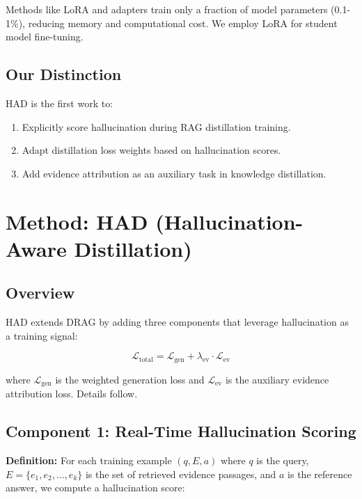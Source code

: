 \documentclass[11pt,a4paper]{article}
\begin{document}
Methods like LoRA \cite{lora} and adapters train only a fraction of model parameters (0.1-1\%), reducing memory and computational cost. We employ LoRA for student model fine-tuning.

\subsection{Our Distinction}

HAD is the first work to:
\begin{enumerate}
    \item Explicitly score hallucination during RAG distillation training.
    \item Adapt distillation loss weights based on hallucination scores.
    \item Add evidence attribution as an auxiliary task in knowledge distillation.
\end{enumerate}

\section{Method: HAD (Hallucination-Aware Distillation)}
\label{sec:method}

\subsection{Overview}

HAD extends DRAG by adding three components that leverage hallucination as a training signal:

\begin{equation}
\mathcal{L}_{\text{total}} = \mathcal{L}_{\text{gen}} + \lambda_{\text{ev}} \cdot \mathcal{L}_{\text{ev}}
\end{equation}

where $\mathcal{L}_{\text{gen}}$ is the weighted generation loss and $\mathcal{L}_{\text{ev}}$ is the auxiliary evidence attribution loss. Details follow.

\subsection{Component 1: Real-Time Hallucination Scoring}
\label{sec:scoring}

\textbf{Definition:} For each training example $(q, E, a)$ where $q$ is the query, $E = \{e_1, e_2, \ldots, e_k\}$ is the set of retrieved evidence passages, and $a$ is the reference answer, we compute a hallucination score:
\end{document}
